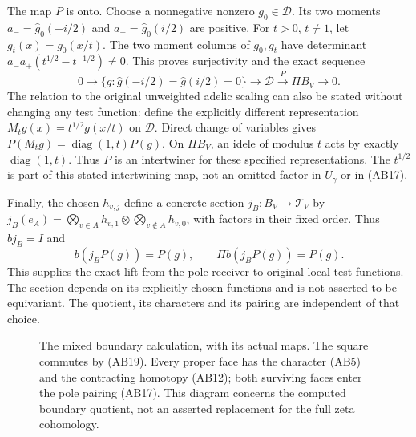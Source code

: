 The map $P$ is onto. Choose a nonnegative nonzero $g_0\in\mathcal D$.
Its two moments $a_-=\widehat g_0(-i/2)$ and
$a_+=\widehat g_0(i/2)$ are positive. For $t>0$, $t\ne1$, let
$g_t(x)=g_0(x/t)$. The two moment columns of $g_0,g_t$ have determinant
$a_-a_+(t^{1/2}-t^{-1/2})\ne0$. This proves surjectivity and the exact
sequence
\[
 0\longrightarrow\{g:\widehat g(-i/2)=\widehat g(i/2)=0\}
 \longrightarrow\mathcal D\xrightarrow{P}\Pi B_V\longrightarrow0.
 \tag{AB18}
\]
The relation to the original unweighted adelic scaling can also be stated
without changing any test function: define the explicitly different
representation $M_tg(x)=t^{1/2}g(x/t)$ on $\mathcal D$. Direct change of
variables gives $P(M_tg)=\operatorname{diag}(1,t)P(g)$. On $\Pi B_V$,
an idele of modulus $t$ acts by exactly $\operatorname{diag}(1,t)$.
Thus $P$ is an intertwiner for these specified representations. The
$t^{1/2}$ is part of this stated intertwining map, not an omitted factor
in $U_\gamma$ or in (AB17).

Finally, the chosen $h_{v,j}$ define a concrete section
$j_B:B_V\to\mathcal T_V$ by
$j_B(e_A)=\bigotimes_{v\in A}h_{v,1}\otimes
\bigotimes_{v\notin A}h_{v,0}$, with factors in their fixed order.
Thus $bj_B=I$ and
\[
 b(j_BP(g))=P(g),\qquad \Pi b(j_BP(g))=P(g).
 \tag{AB19}
\]
This supplies the exact lift from the pole receiver to original local test
functions. The section depends on its explicitly chosen functions and is
not asserted to be equivariant. The quotient, its characters and its
pairing are independent of that choice.

\begin{figure}[ht]
\centering
{}
\caption{The mixed boundary calculation, with its actual maps. The square
commutes by (AB19). Every proper face has the character (AB5) and the
contracting homotopy (AB12); both surviving faces enter the pole pairing
(AB17). This diagram concerns the computed boundary quotient, not an
asserted replacement for the full zeta cohomology.}
\end{figure}


